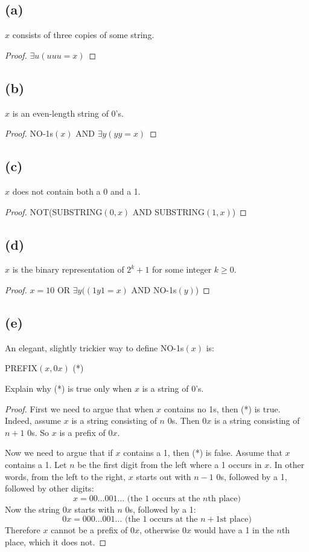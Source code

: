\documentclass[14pt]{extarticle}
\begin{document}
\subsection{(a)}
$x$ consists of three copies of some string.
\begin{proof}
$\exists u (uuu = x)$
\end{proof}

\subsection{(b)}
$x$ is an even-length string of 0’s.
\begin{proof}
NO-1s$(x)$ AND $\exists y (yy = x)$
\end{proof}

\subsection{(c)}
$x$ does not contain both a 0 and a 1.
\begin{proof}
NOT(SUBSTRING$(0,x)$ AND SUBSTRING$(1, x)$)
\end{proof}

\subsection{(d)}
$x$ is the binary representation of $2^k + 1$ for some integer $k \geq 0$.
\begin{proof}
$x = 10 \text{ OR }\exists y ((1y1 = x)$ AND NO-1s$(y)$)
\end{proof}

\subsection{(e)}
An elegant, slightly trickier way to define NO-1s$(x)$ is:

\begin{center}
PREFIX$(x, 0x)$ (*)
\end{center}

Explain why (*) is true only when $x$ is a string of 0’s.
\begin{proof}
First we need to argue that when $x$ contains no 1s, then (*) is true. Indeed, assume $x$ is a string consisting of $n$ 0s. Then $0x$ is a string consisting of $n+1$ 0s. So $x$ is a prefix of $0x$.

Now we need to argue that if $x$ contains a 1, then (*) is false. Assume that $x$ contains a 1. Let $n$ be the first digit from the left where a 1 occurs in $x$. In other words, from the left to the right, $x$ starts out with $n - 1$ 0s, followed by a 1, followed by other digits:
$$
x = 00 \ldots 001 \ldots \text{   (the 1 occurs at the $n$th place)}
$$
Now the string $0x$ starts with $n$ 0s, followed by a 1:
$$
0x = 000 \ldots 001 \ldots \text{   (the 1 occurs at the $n+1$st place)}
$$
Therefore $x$ cannot be a prefix of $0x$, otherwise $0x$ would have a 1 in the $n$th place, which it does not.
\end{proof}
\end{document}
